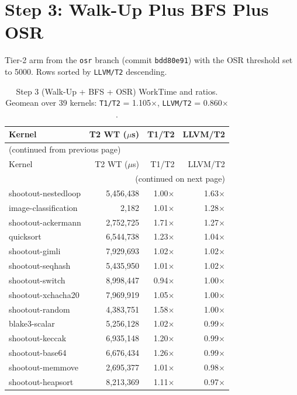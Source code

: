 \section{Step 3: Walk-Up Plus BFS Plus OSR}
\label{sec:appB:step3}

Tier-2 arm from the \texttt{osr} branch (commit \texttt{bdd80e91}) with the OSR threshold set to 5000. Rows sorted by \texttt{LLVM/T2} descending.

\begin{longtable}{l r r r}
\caption{Step 3 (Walk-Up + BFS + OSR) WorkTime and ratios. Geomean over 39 kernels: \texttt{T1/T2} = 1.105$\times$, \texttt{LLVM/T2} = 0.860$\times$.}
\label{tbl:appB:step3:wt}\\
\toprule
Kernel & T2 WT ($\mu$s) & T1/T2 & LLVM/T2 \\
\midrule
\endfirsthead
\multicolumn{4}{l}{\small (continued from previous page)} \\
\toprule
Kernel & T2 WT ($\mu$s) & T1/T2 & LLVM/T2 \\
\midrule
\endhead
\midrule
\multicolumn{4}{r}{\small (continued on next page)} \\
\endfoot
\bottomrule
\endlastfoot
shootout-nestedloop & 5{,}456{,}438 & 1.00$\times$ & 1.63$\times$ \\
image-classification & 2{,}182 & 1.01$\times$ & 1.28$\times$ \\
shootout-ackermann & 2{,}752{,}725 & 1.71$\times$ & 1.27$\times$ \\
quicksort & 6{,}544{,}738 & 1.23$\times$ & 1.04$\times$ \\
shootout-gimli & 7{,}929{,}693 & 1.02$\times$ & 1.02$\times$ \\
shootout-seqhash & 5{,}435{,}950 & 1.01$\times$ & 1.02$\times$ \\
shootout-switch & 8{,}998{,}447 & 0.94$\times$ & 1.00$\times$ \\
shootout-xchacha20 & 7{,}969{,}919 & 1.05$\times$ & 1.00$\times$ \\
shootout-random & 4{,}383{,}751 & 1.58$\times$ & 1.00$\times$ \\
blake3-scalar & 5{,}256{,}128 & 1.02$\times$ & 0.99$\times$ \\
shootout-keccak & 6{,}935{,}148 & 1.20$\times$ & 0.99$\times$ \\
shootout-base64 & 6{,}676{,}434 & 1.26$\times$ & 0.99$\times$ \\
shootout-memmove & 2{,}695{,}377 & 1.01$\times$ & 0.98$\times$ \\
shootout-heapsort & 8{,}213{,}369 & 1.11$\times$ & 0.97$\times$ \\

\end{longtable}
